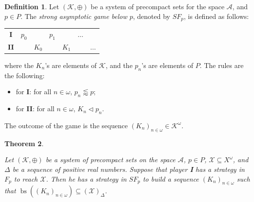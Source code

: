\documentclass[a4paper,11pt]{article}
\newtheorem{thm}{Theorem}[section]
\theoremstyle{definition}
\newtheorem{defin}[thm]{Definition}
\numberwithin{equation}{section}
\newcommand{\X}{\mathcal{X}}
\newcommand{\I}{\textbf{I}}
\newcommand{\K}{\mathcal{K}}
\DeclareMathOperator{\bs}{bs}
\begin{document}
\begin{defin}

Let $(\K, \oplus)$ be a system of precompact sets for the space $\mathcal{A}$, and $p \in P$. The \emph{strong asymptotic game below $p$}, denoted by $SF_p$, is defined as follows:

\smallskip

\begin{tabular}{ccccccc}
\textbf{I} & $p_0$ & & $p_1$ & & $\hdots$ & \\
\textbf{II} & & $K_0$ & & $K_1$ & & $\hdots$ 
\end{tabular}

\smallskip

\noindent where the $K_n$'s are elements of $\K$, and the $p_n$'s are elements of $P$. The rules are the following:

\begin{itemize}

\item for \textbf{I}: for all $n \in \omega$, $p_n \lessapprox p$;

\item for \textbf{II}: for all $n \in \omega$, $K_n \vartriangleleft p_n$.

\end{itemize}

\noindent The outcome of the game is the sequence $(K_n)_{n \in \omega} \in \K^\omega$.

\end{defin}

\begin{thm}\label{AbstractApproxExact}

Let $(\K, \oplus)$ be a system of precompact sets on the space $\mathcal{A}$, $p \in P$, $\X \subseteq X^\omega$, and $\Delta$ be a sequence of positive real numbers. Suppose that player \I{} has a strategy in $F_p$ to reach $\X$. Then he has a strategy in $SF_p$ to build a sequence $(K_n)_{n \in \omega}$ such that $\bs((K_n)_{n \in \omega}) \subseteq (\X)_\Delta$.

\end{thm}
\end{document}
